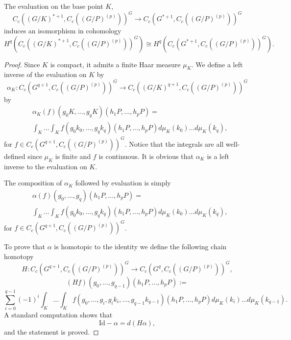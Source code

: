 \documentclass[10pt,a4paper]{amsart}
\begin{document}
\begin{lem}\label{K invariant representative}
The evaluation on the base point $K$, 
$$C_c((G/K)^{*+1},C_c((G/P)^{(p)}))^G\longrightarrow  C_c(G^{*+1},C_c((G/P)^{(p)}))^G$$
induces an isomorphism in cohomology
$$ H^q(C_c((G/K)^{*+1},C_c((G/P)^{(p)}))^G)\cong H^q( C_c(G^{*+1},C_c((G/P)^{(p)}))^G).$$
\end{lem}

\begin{proof}
Since $K$ is compact, it admits a finite Haar measure $\mu_K$. We define a left inverse of the evaluation on $K$ by 
$$
\alpha_K:C_c(G^{q+1},C_c((G/P)^{(p)}))^G\longrightarrow C_c((G/K)^{q+1},C_c((G/P)^{(p)}))^G$$
by
\begin{align*}
&\alpha_K(f)(g_0K,\dots,g_qK)(h_1P,\ldots ,h_pP)=\\
&\int_K \ldots \int_K f(g_0k_0,\ldots,g_qk_q)(h_1P,\ldots,h_pP)d\mu_K(k_0)\ldots d\mu_K(k_q), \end{align*}
for $f\in C_c(G^{q+1},C_c((G/P)^{(p)}))^G$. 
Notice that the integrals are all well-defined since $\mu_K$ is finite and $f$ is continuous. It is obvious that $\alpha_K$ is a left inverse to the evaluation on $K$. 

The composition of  $\alpha_K$ followed by evaluation is simply
\begin{align*}
&\alpha(f)(g_0,\ldots,g_q) (h_1P,\ldots ,h_pP)=\\
&\int_K \ldots \int_K f(g_0k_0,\ldots,g_qk_q)(h_1P,\ldots,h_pP)d\mu_K(k_0)\ldots d\mu_K(k_q), \end{align*}
for $f\in C_c(G^{q+1},C_c((G/P)^{(p)}))^G$. 

To prove that $\alpha$ is homotopic to the identity we define the following chain homotopy
$$
H:C_c(G^{q+1},C_c((G/P)^{(p)}))^G \rightarrow C_c(G^{q},C_c((G/P)^{(p)}))^G,
$$
$$
(H f)(g_0,\ldots,g_{q-1})(h_1P,\ldots,h_pP):=
$$
$$
\sum_{i=0}^{q-1} (-1)^i \int_K \ldots \int_K f(g_0,\ldots,g_i,g_ik_i,\ldots,g_{q-1}k_{q-1})(h_1P,\ldots,h_pP)d\mu_K(k_i)\ldots d\mu_K(k_{q-1}). 
$$
A standard computation shows that 
$$
\mathrm{Id}-\alpha=d(H\alpha),
$$
and the statement is proved. 
\end{proof}
\end{document}
